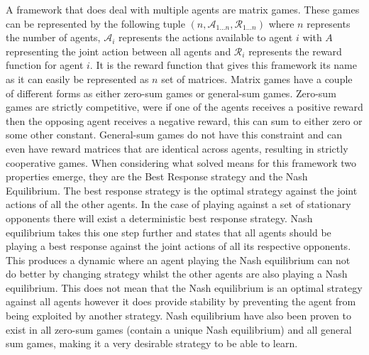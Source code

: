 \documentclass{article}
\begin{document}
A framework that does deal with multiple agents are matrix games. These games
can be represented by the following tuple $(n, \mathcal{A}_{1...n}, \mathcal{R}_{1...n})$
where $n$ represents the number of agents, $\mathcal{A}_{i}$ represents the actions
available to agent $i$ with $A$ representing the joint action between all agents and 
$\mathcal{R}_{i}$ represents the reward function for agent $i$. It is the reward 
function that gives this framework its name as it can easily be represented as 
$n$ set of matrices. Matrix games have a couple of different forms as either zero-sum games or general-sum
games. Zero-sum games are strictly competitive, were if one of the agents receives a
positive reward then the opposing agent receives a negative reward, this can sum to 
either zero or some other constant. General-sum games do not have this constraint and
can even have reward matrices that are identical across agents, resulting in strictly
cooperative games. When considering what solved means for this framework two properties emerge, they are
the Best Response strategy and the Nash Equilibrium. The best response strategy is the optimal strategy against the joint actions of all the
other agents. In the case of playing against a set of stationary opponents there will 
exist a deterministic best response strategy. Nash equilibrium takes this one step further and states that all agents should be playing
a best response against the joint actions of all its respective opponents. This produces
a dynamic where an agent playing the Nash equilibrium can not do better by changing strategy
whilst the other agents are also playing a Nash equilibrium. This does not mean that the
Nash equilibrium is an optimal strategy against all agents however it does provide 
stability by preventing the agent from being exploited by another strategy. Nash equilibrium
have also been proven to exist in all zero-sum games (contain a unique Nash equilibrium) and
all general sum games, making it a very desirable strategy to be able to learn.
\end{document}
